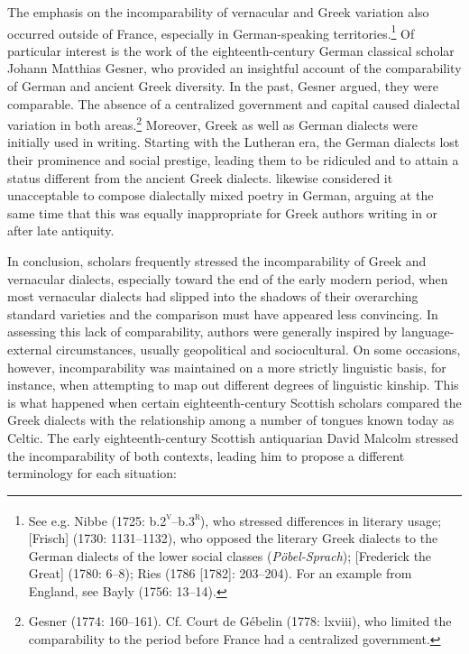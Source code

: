 The emphasis on the incomparability of vernacular and Greek variation also occurred outside of France, especially in German-speaking territories.\footnote{See e.g. Nibbe (1725: b.2\textsc{\textsuperscript{v}}\textsc{–}b.3\textsc{\textsuperscript{r}}), who stressed differences in literary usage; [Frisch] (1730: 1131–1132), who opposed the literary Greek dialects to the German dialects of the lower social classes (\textit{Pöbel-Sprach}); [Frederick the Great] (1780: 6–8); Ries (1786 [1782]: 203–204). For an example from England, see Bayly (1756: 13–14).} Of particular interest is the work of the eighteenth-century German classical scholar Johann Matthias Gesner, who provided an insightful account of the comparability of German and ancient Greek diversity. In the past, Gesner argued, they were comparable. The absence of a centralized government and capital caused dialectal variation in both areas.\footnote{Gesner (1774: 160–161). Cf. Court de Gébelin (1778: lxviii), who limited the comparability to the period before France had a centralized government.} Moreover, Greek as well as German dialects were initially used in writing. Starting with the Lutheran era, the German dialects lost their prominence and social prestige, leading them to be ridiculed and to attain a status different from the ancient Greek dialects. \citet[162]{Gesner1774} likewise considered it unacceptable to compose dialectally mixed poetry in German, arguing at the same time that this was equally inappropriate for Greek authors writing in or after late antiquity.

In conclusion, scholars frequently stressed the incomparability of Greek and vernacular dialects, especially toward the end of the early modern period, when most vernacular dialects had slipped into the shadows of their overarching standard varieties and the comparison must have appeared less convincing. In assessing this lack of comparability, authors were generally inspired by language-external circumstances, usually geopolitical and sociocultural. On some occasions, however, incomparability was maintained on a more strictly linguistic basis, for instance, when attempting to map out different degrees of linguistic kinship. This is what happened when certain eighteenth-century Scottish scholars compared the Greek dialects with the relationship among a number of tongues known today as Celtic. The early eighteenth-century Scottish antiquarian David Malcolm stressed the incomparability of both contexts, leading him to propose a different terminology for each situation:

